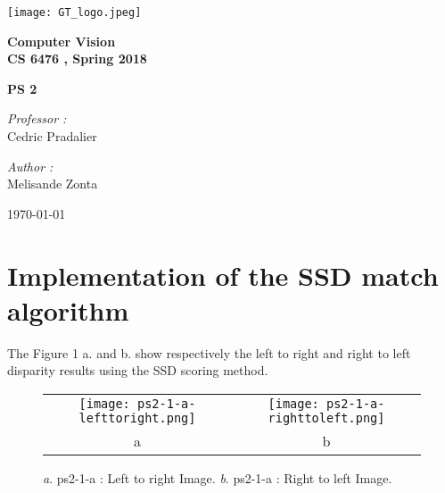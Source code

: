 \documentclass[a4paper,11pt]{article}
\begin{document}

\begin{titlepage}

\begin{center}
\texttt{[image: GT\_logo.jpeg]}
\end{center}
\hrulefill
\begin{center}\bfseries\huge
   Computer Vision \\
   CS 6476 , Spring 2018\\
   \end{center}
  \begin{center}\bfseries\large
     PS 2\\
    \hrulefill
\end{center}
\vspace*{1cm}
\begin{minipage}[t]{0.6\textwidth}
  \begin{flushleft} \large
    \emph{Professor : }\\
    Cedric Pradalier \\
  \end{flushleft}
\end{minipage}
\begin{minipage}[t]{0.3\textwidth}
  \begin{flushright} \large
    \emph{Author :} \\
    Melisande Zonta \\
  \end{flushright}
\end{minipage}
\begin{flushright}
       \today 
\end{flushright} 
\end{titlepage}

\tableofcontents
\clearpage



\section{Implementation of the SSD match algorithm}

The Figure 1 a. and b. show respectively the left to right and right to left disparity results using the SSD scoring method.

 \begin{figure}[H]
\begin{center}
\begin{tabular}{cc}
	\texttt{[image: ps2-1-a-lefttoright.png]}&
	\texttt{[image: ps2-1-a-righttoleft.png]}\\
	a&b
\end{tabular}
\end{center}
\caption{ 
\textit{a}. ps2-1-a : Left to right Image.  \textit{b}. ps2-1-a : Right to left Image. }
\label{ps2-1}
\end{figure}
\end{document}
